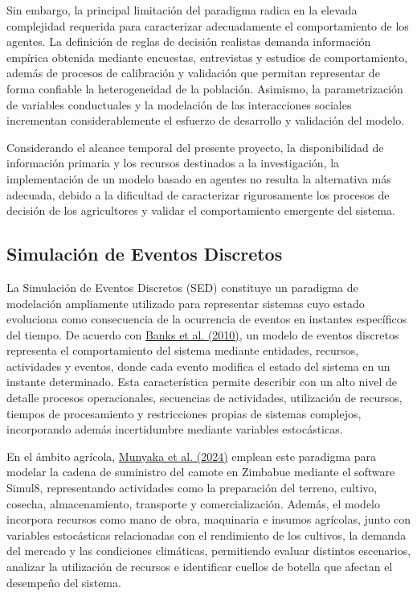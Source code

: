 \documentclass[12pt]{report}
\newcommand{\citeref}[2]{\hyperlink{ref:#1}{#2}}
\begin{document}
Sin embargo, la principal limitación del paradigma radica en la elevada complejidad requerida para caracterizar adecuadamente el comportamiento de los agentes. La definición de reglas de decisión realistas demanda información empírica obtenida mediante encuestas, entrevistas y estudios de comportamiento, además de procesos de calibración y validación que permitan representar de forma confiable la heterogeneidad de la población. Asimismo, la parametrización de variables conductuales y la modelación de las interacciones sociales incrementan considerablemente el esfuerzo de desarrollo y validación del modelo.

Considerando el alcance temporal del presente proyecto, la disponibilidad de información primaria y los recursos destinados a la investigación, la implementación de un modelo basado en agentes no resulta la alternativa más adecuada, debido a la dificultad de caracterizar rigurosamente los procesos de decisión de los agricultores y validar el 
comportamiento emergente del sistema.

\subsection{Simulación de Eventos Discretos}

La Simulación de Eventos Discretos (SED) constituye un paradigma de modelación ampliamente utilizado para representar sistemas cuyo estado evoluciona como consecuencia de la ocurrencia de eventos en instantes específicos del tiempo. De acuerdo con \citeref{banks2010}{Banks et al. (2010)}, un modelo de eventos discretos representa el comportamiento del sistema mediante entidades, recursos, actividades y eventos, donde cada evento modifica el estado del sistema en un instante determinado. Esta característica permite describir con un alto nivel de detalle procesos operacionales, secuencias de actividades, utilización de recursos, tiempos de procesamiento y restricciones propias de sistemas complejos, incorporando además incertidumbre mediante variables estocásticas.

En el ámbito agrícola, \citeref{munyaka2024}{Munyaka et al. (2024)} emplean este paradigma para modelar la cadena de suministro del camote en Zimbabue mediante el software Simul8, representando actividades como la preparación del terreno, cultivo, cosecha, almacenamiento, transporte y comercialización. Además, el modelo incorpora recursos como mano de obra, maquinaria e insumos agrícolas, junto con variables estocásticas relacionadas con el rendimiento de los cultivos, la demanda del mercado y las condiciones climáticas, permitiendo evaluar distintos escenarios, analizar la utilización de recursos e identificar cuellos de botella que afectan el desempeño del sistema.
\end{document}
